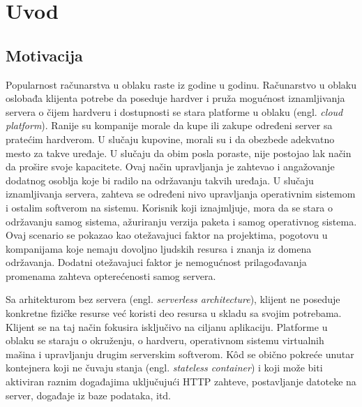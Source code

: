 \documentclass[12pt,oneside]{memoir}
\begin{document}
\frontmatter
\naslovna
\komisija
\apstrakt
\tableofcontents*

\mainmatter

\chapter{Uvod}

\section{Motivacija}
Popularnost računarstva u oblaku raste iz godine u godinu. Računarstvo u oblaku oslobađa klijenta potrebe da poseduje hardver i pruža mogućnost iznamljivanja servera o čijem hardveru i dostupnosti se stara platforme u oblaku (engl. \emph{cloud platform}). Ranije su kompanije morale da kupe ili zakupe određeni server sa pratećim hardverom. U slučaju kupovine, morali su i da obezbede adekvatno mesto za takve uređaje. U slučaju da obim posla poraste, nije postojao lak način da prošire svoje kapacitete. Ovaj način upravljanja je zahtevao i angažovanje dodatnog osoblja koje bi radilo na održavanju takvih uređaja. U slučaju iznamljivanja servera, zahteva se određeni nivo upravljanja operativnim sistemom i ostalim softverom na sistemu. Korisnik koji iznajmljuje, mora da se stara o održavanju samog sistema, ažuriranju verzija paketa i samog operativnog sistema. Ovaj scenario se pokazao kao otežavajuci faktor na projektima, pogotovu u kompanijama koje nemaju dovoljno ljudskih resursa i znanja iz domena održavanja. Dodatni otežavajuci faktor je nemogućnost prilagođavanja promenama zahteva opterećenosti samog servera. 

Sa arhitekturom bez servera (engl. \emph{serverless architecture}), klijent ne poseduje konkretne fizičke resurse već koristi deo resursa u skladu sa svojim potrebama. Klijent se na taj način fokusira isključivo na ciljanu aplikaciju. Platforme u oblaku se staraju o okruženju, o hardveru, operativnom sistemu virtualnih mašina i upravljanju drugim serverskim softverom. Kôd se obično pokreće unutar kontejnera koji ne čuvaju stanja (engl. \emph{stateless container}) i koji može biti aktiviran raznim događajima uključujući HTTP zahteve, postavljanje datoteke na server, događaje iz baze podataka, itd.
\end{document}
